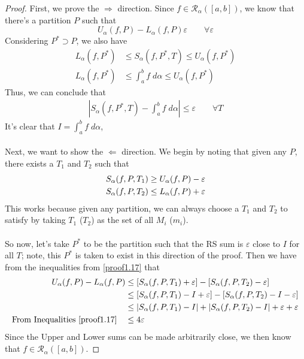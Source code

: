 \documentclass[12pt]{article}
\theoremstyle{plain}
\theoremstyle{definition}
\theoremstyle{remark}
\begin{document}
\begin{proof}
First, we prove the $\Rightarrow$ direction. Since $f\in\mathscr{R}_\alpha([a,b])$, we know that there's a partition $P$ such that
    \[ U_\alpha(f,P) - L_\alpha(f,P)\varepsilon \qquad 
    \forall \varepsilon \]
Considering $P^*\supset P$, we also have
\begin{align*}
    L_\alpha(f,P^*)&\leq S_\alpha(f,P^*,T) \leq U_\alpha(f,P^*)\\
    L_\alpha(f,P^*)&\leq \int^b_a f\;d\alpha \leq U_\alpha(f,P^*)
\end{align*}
Thus, we can conclude that 
\begin{align*}
    \left\lvert S_\alpha(f,P^*,T) - \int^b_a f\;d\alpha 
    \right\rvert \leq \varepsilon \qquad \forall T
\end{align*}
It's clear that $I=\int^b_a f\;d\alpha$,
\\
\\
Next, we want to show the $\Leftarrow$ direction. We begin by noting that given any $P$, there exists a $T_1$ and $T_2$ such that
\begin{align}
    S_\alpha(f,P,T_1) &\geq U_\alpha(f,P) - \varepsilon\notag\\
    S_\alpha(f,P,T_2) &\leq L_\alpha(f,P) + \varepsilon
    \label{proof1.17}
\end{align}
This works because given any partition, we can always choose a $T_1$ and $T_2$ to satisfy by taking $T_1$ ($T_2$) as the set of all $M_i$ ($m_i$). 
\\
\\
So now, let's take $P^*$ to be the partition such that the RS sum is $\varepsilon$ close to $I$ for all $T$; note, this $P^*$ is taken to exist in this direction of the proof. Then we have from the inequalities from \ref{proof1.17} that
\begin{align*}
    U_\alpha(f,P) - L_\alpha(f,P) &\leq 
        \left[ S_\alpha(f,P,T_1) + \varepsilon\right] -
        \left[ S_\alpha(f,P,T_2) - \varepsilon\right] \\
    &\leq \left[ S_\alpha(f,P,T_1) - I + \varepsilon\right] -
        \left[ S_\alpha(f,P,T_2) - I - \varepsilon\right] \\
    &\leq \left\lvert S_\alpha(f,P,T_1) - I \right\rvert+       
        \left\lvert S_\alpha(f,P,T_2) - I \right\rvert
        + \varepsilon + \varepsilon \\
    \text{From Inequalities \ref{proof1.17}} \quad
        &\leq 4\varepsilon
\end{align*}
Since the Upper and Lower sums can be made arbitrarily close, we then know that $f\in\mathscr{R}_\alpha([a,b])$.
\end{proof}
\end{document}
